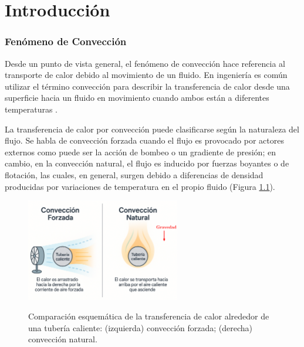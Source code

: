 \chapter{Introducción}
\label{cap:intro}


\subsection*{Fenómeno de Convección}

Desde un punto de vista general, el fenómeno de convección hace referencia al transporte de calor debido al movimiento de un fluido. En ingeniería es común utilizar el término convección para describir la transferencia de calor desde una superficie hacia un fluido en movimiento cuando ambos están a diferentes temperaturas \cite{cengelheat,incropera}. 

La transferencia de calor por convección puede clasificarse según la naturaleza del flujo. Se habla de convección forzada cuando el flujo es provocado por actores externos como puede ser la acción de bombeo o un gradiente de presión; en cambio, en la convección natural, el flujo es inducido por fuerzas boyantes o de flotación, las cuales, en general, surgen debido a diferencias de densidad producidas por variaciones de temperatura en el propio fluido (Figura \ref{fig:natural_forzada}).

\begin{figure}[H]
 \centering
    \includegraphics[width=0.6\textwidth]{figures/cap1/natural_forzada.eps}
    \label{fig:natural_forzada} 
 \caption{Comparación esquemática de la transferencia de calor alrededor de una tubería caliente: (izquierda) convección forzada; (derecha) convección natural.} 
 \label{fig:natural_forzada}
\end{figure}

